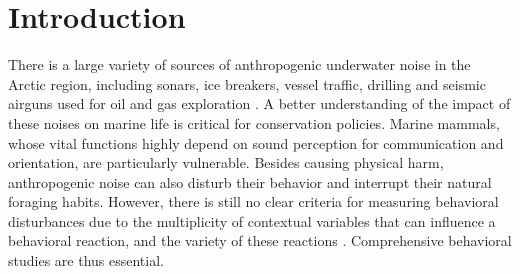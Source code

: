 \documentclass[aoas]{imsart}
\theoremstyle{definition}
\theoremstyle{remark}
\theoremstyle{remark}
\newcommand {\1}{\mathbb{1}}
\begin{document}
\begin{frontmatter}
\begin{keyword}
\end{keyword}

\end{frontmatter}


\section{Introduction}

There is a large variety of sources of anthropogenic underwater noise in the Arctic region, including sonars, ice breakers, vessel traffic, drilling  and seismic airguns used for oil and gas exploration \citep{halliday_underwater_2020}.
A better understanding of the impact of these noises on marine life is critical for conservation policies. Marine mammals, whose vital functions highly depend on sound perception for communication and orientation, are particularly vulnerable. Besides causing physical harm, anthropogenic noise can also disturb their behavior and interrupt their natural foraging habits. However, there is still no clear criteria for measuring behavioral disturbances due to the multiplicity of contextual variables that can influence a behavioral reaction, and the variety of these reactions \citep{southall_marine_2008,southall_marine_2019}. Comprehensive behavioral studies are thus essential.\\
\end{document}
